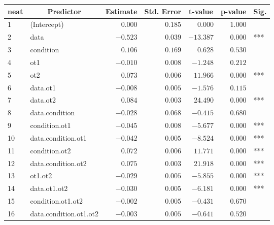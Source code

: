\begin{table}[!tbp]
\begin{center}
\begin{tabular}{llrrrrl}
\hline\hline
\multicolumn{1}{l}{neat}&\multicolumn{1}{c}{Predictor}&\multicolumn{1}{c}{Estimate}&\multicolumn{1}{c}{Std. Error}&\multicolumn{1}{c}{t-value}&\multicolumn{1}{c}{p-value}&\multicolumn{1}{c}{Sig.}\tabularnewline
\hline
1&(Intercept)&$ 0.000$&$0.185$&$  0.000$&$1.000$& \tabularnewline
2&data&$-0.523$&$0.039$&$-13.387$&$0.000$&***\tabularnewline
3&condition&$ 0.106$&$0.169$&$  0.628$&$0.530$& \tabularnewline
4&ot1&$-0.010$&$0.008$&$ -1.248$&$0.212$& \tabularnewline
5&ot2&$ 0.073$&$0.006$&$ 11.966$&$0.000$&***\tabularnewline
6&data.ot1&$-0.008$&$0.005$&$ -1.576$&$0.115$& \tabularnewline
7&data.ot2&$ 0.084$&$0.003$&$ 24.490$&$0.000$&***\tabularnewline
8&data.condition&$-0.028$&$0.068$&$ -0.415$&$0.680$& \tabularnewline
9&condition.ot1&$-0.045$&$0.008$&$ -5.677$&$0.000$&***\tabularnewline
10&data.condition.ot1&$-0.042$&$0.005$&$ -8.524$&$0.000$&***\tabularnewline
11&condition.ot2&$ 0.072$&$0.006$&$ 11.771$&$0.000$&***\tabularnewline
12&data.condition.ot2&$ 0.075$&$0.003$&$ 21.918$&$0.000$&***\tabularnewline
13&ot1.ot2&$-0.029$&$0.005$&$ -5.855$&$0.000$&***\tabularnewline
14&data.ot1.ot2&$-0.030$&$0.005$&$ -6.181$&$0.000$&***\tabularnewline
15&condition.ot1.ot2&$-0.002$&$0.005$&$ -0.431$&$0.670$& \tabularnewline
16&data.condition.ot1.ot2&$-0.003$&$0.005$&$ -0.641$&$0.520$& \tabularnewline
\hline
\end{tabular}\end{center}
\end{table}
